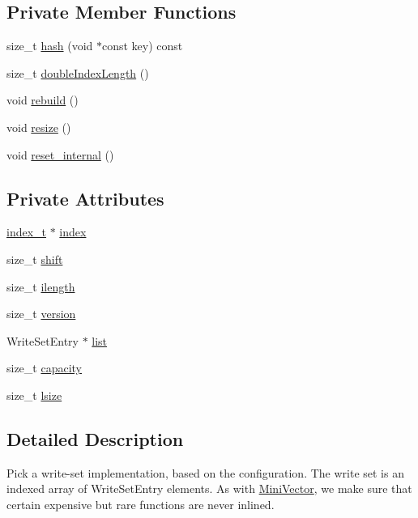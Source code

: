 \subsection*{Private Member Functions}
\begin{DoxyCompactItemize}
\item 
size\-\_\-t \hyperlink{classstm_1_1WriteSet_a07a039f248b6f18a81dae1ef00bb5d1b}{hash} (void $\ast$const key) const 
\item 
size\-\_\-t \hyperlink{classstm_1_1WriteSet_a7fc8315912c0e2155d182b7c76616e3a}{double\-Index\-Length} ()
\item 
void \hyperlink{classstm_1_1WriteSet_a74d7f6aaf7575622d6395f4f87122c29}{rebuild} ()
\item 
void \hyperlink{classstm_1_1WriteSet_a9fa08f0cb7125900e5ad33f0bae35f31}{resize} ()
\item 
void \hyperlink{classstm_1_1WriteSet_aed2680209e791a7902f11a13fe9478e1}{reset\-\_\-internal} ()
\end{DoxyCompactItemize}
\subsection*{Private Attributes}
\begin{DoxyCompactItemize}
\item 
\hyperlink{structstm_1_1WriteSet_1_1index__t}{index\-\_\-t} $\ast$ \hyperlink{classstm_1_1WriteSet_a0d38e399a118c0e97d720819ba664cdc}{index}
\item 
size\-\_\-t \hyperlink{classstm_1_1WriteSet_a73bd9654a4702f75163b10c275a0353f}{shift}
\item 
size\-\_\-t \hyperlink{classstm_1_1WriteSet_a4489da9b5a49095815bc8a2c7e1831cc}{ilength}
\item 
size\-\_\-t \hyperlink{classstm_1_1WriteSet_ac226645f8f45a68b9a380bdb94dd5978}{version}
\item 
Write\-Set\-Entry $\ast$ \hyperlink{classstm_1_1WriteSet_a5065821ad0f6d77e6ed5f7bf39f8cb6a}{list}
\item 
size\-\_\-t \hyperlink{classstm_1_1WriteSet_ae95a7b68282e9c303e03fcc4a420edc4}{capacity}
\item 
size\-\_\-t \hyperlink{classstm_1_1WriteSet_a95f05e20e05269065de443a716aa7b6c}{lsize}
\end{DoxyCompactItemize}


\subsection{Detailed Description}
Pick a write-\/set implementation, based on the configuration. The write set is an indexed array of Write\-Set\-Entry elements. As with \hyperlink{classstm_1_1MiniVector}{Mini\-Vector}, we make sure that certain expensive but rare functions are never inlined. 

